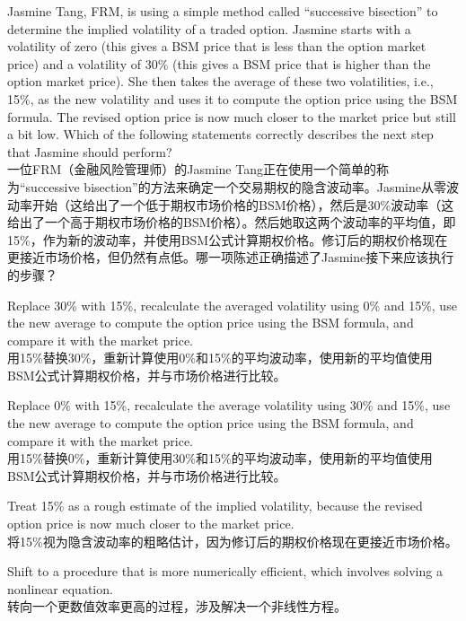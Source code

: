 \documentclass{article}
\newcounter{question} %
\begin{document}
\begin{question}
    Jasmine Tang, FRM, is using a simple method called “successive bisection” to determine the implied volatility of a traded option. Jasmine starts with a volatility of zero (this gives a BSM price that is less than the option market price) and a volatility of 30\% (this gives a BSM price that is higher than the option market price). She then takes the average of these two volatilities, i.e., 15\%, as the new volatility and uses it to compute the option price using the BSM formula. The revised option price is now much closer to the market price but still a bit low. Which of the following statements correctly describes the next step that Jasmine should perform?\\
    一位FRM（金融风险管理师）的Jasmine Tang正在使用一个简单的称为“successive bisection”的方法来确定一个交易期权的隐含波动率。Jasmine从零波动率开始（这给出了一个低于期权市场价格的BSM价格），然后是30\%波动率（这给出了一个高于期权市场价格的BSM价格）。然后她取这两个波动率的平均值，即15\%，作为新的波动率，并使用BSM公式计算期权价格。修订后的期权价格现在更接近市场价格，但仍然有点低。哪一项陈述正确描述了Jasmine接下来应该执行的步骤？
\end{question}

\begin{choices}
    \item Replace 30\% with 15\%, recalculate the averaged volatility using 0\% and 15\%, use the new average to compute the option price using the BSM formula, and compare it with the market price.\\
    用15\%替换30\%，重新计算使用0\%和15\%的平均波动率，使用新的平均值使用BSM公式计算期权价格，并与市场价格进行比较。
    \item Replace 0\% with 15\%, recalculate the average volatility using 30\% and 15\%, use the new average to compute the option price using the BSM formula, and compare it with the market price.\\
    用15\%替换0\%，重新计算使用30\%和15\%的平均波动率，使用新的平均值使用BSM公式计算期权价格，并与市场价格进行比较。
    \item Treat 15\% as a rough estimate of the implied volatility, because the revised option price is now much closer to the market price.\\
    将15\%视为隐含波动率的粗略估计，因为修订后的期权价格现在更接近市场价格。
    \item Shift to a procedure that is more numerically efficient, which involves solving a nonlinear equation.\\
    转向一个更数值效率更高的过程，涉及解决一个非线性方程。
\end{choices}
\end{document}
